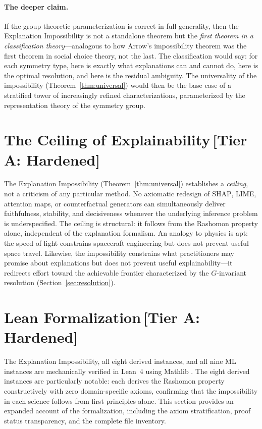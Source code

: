 \documentclass[11pt,a4paper]{article}
\newcommand{\SHAP}{\textsc{SHAP}}
\begin{document}
\paragraph{The deeper claim.}
If the group-theoretic parameterization is correct in full generality, then
the Explanation Impossibility is not a standalone theorem but the \emph{first
theorem in a classification theory}---analogous to how Arrow's impossibility
theorem \citep{arrow1951social} was the first theorem in social choice theory,
not the last.  The classification would say: for each symmetry type, here is
exactly what explanations can and cannot do, here is the optimal resolution,
and here is the residual ambiguity.  The universality of the impossibility
(Theorem~\ref{thm:universal}) would then be the base case of a stratified
tower of increasingly refined characterizations, parameterized by the
representation theory of the symmetry group.

\section{The Ceiling of Explainability\,\textnormal{\normalsize[Tier A: Hardened]}}
\label{sec:ceiling}

The Explanation Impossibility (Theorem~\ref{thm:universal}) establishes
a \emph{ceiling}, not a criticism of any particular method.  No axiomatic
redesign of \SHAP{}, LIME, attention maps, or counterfactual generators can
simultaneously deliver faithfulness, stability, and decisiveness whenever the
underlying inference problem is underspecified.  The ceiling is structural: it
follows from the Rashomon property alone, independent of the explanation
formalism.  An analogy to physics is apt: the speed of light constrains
spacecraft engineering but does not prevent useful space travel.  Likewise, the
impossibility constrains what practitioners may promise about explanations but
does not prevent useful explainability---it redirects effort toward the
achievable frontier characterized by the $G$-invariant resolution
(Section~\ref{sec:resolution}).

\section{Lean Formalization\,\textnormal{\normalsize[Tier A: Hardened]}}
\label{sec:lean}

The Explanation Impossibility, all eight derived instances, and all nine ML
instances are mechanically verified in Lean~4 \citep{demoura2021lean4} using
Mathlib \citep{mathlib2020}.  The eight derived instances are particularly
notable: each derives the Rashomon property constructively with zero domain-specific axioms,
confirming that the impossibility in each science follows from first
principles alone.  This section provides an expanded account of the
formalization, including the axiom stratification, proof status transparency,
and the complete file inventory.
\end{document}
